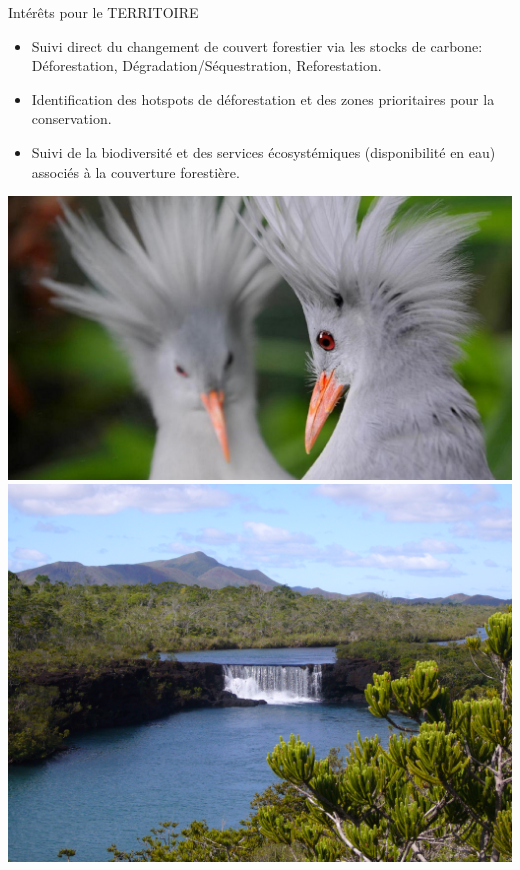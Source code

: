 \documentclass[10pt,table,dvipsnames,compress]{beamer}
\begin{document}
\begin{frame}[label={sec:org33bb818}]{Intérêts pour le TERRITOIRE}
\begin{itemize}
\item Suivi direct du changement de couvert forestier via les stocks de carbone:\\
Déforestation, Dégradation/Séquestration, Reforestation.
\item Identification des hotspots de déforestation et des zones prioritaires pour la conservation.
\item Suivi de la biodiversité et des services écosystémiques (disponibilité en eau) associés à la couverture forestière.
\end{itemize}

\vspace{0.25cm}

\begin{center}
\includegraphics[height=0.3\textheight]{figs/Cagou-WWF.jpg}
\includegraphics[height=0.3\textheight]{figs/Chutes_de_la_madeleine.JPG}
\end{center}
\end{frame}
\end{document}
